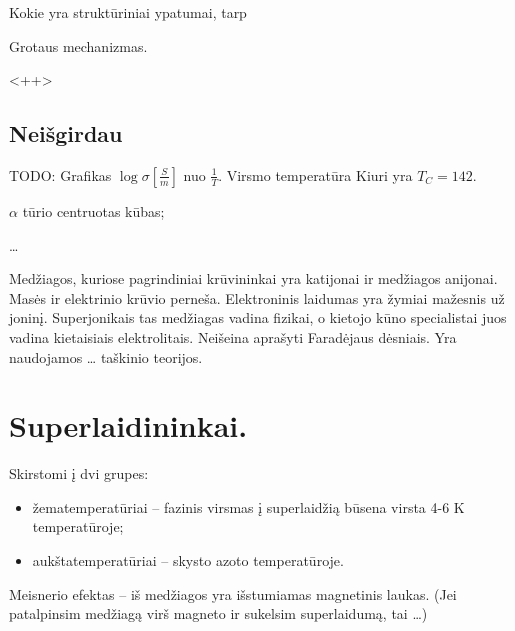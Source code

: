 \begin{remember}
  \item Kokie yra struktūriniai ypatumai, tarp 
  \item Grotaus mechanizmas.

\end{remember}<++>

\subsection{Neišgirdau}

TODO: Grafikas $\log \sigma [\frac{S}{m}]$ nuo $\frac{1}{T}$.
Virsmo temperatūra Kiuri yra $T_{C} = 142$.

\begin{remember}
  \item $\alpha$ tūrio centruotas kūbas;
  \item …
\end{remember}


Medžiagos, kuriose pagrindiniai krūvininkai yra katijonai ir medžiagos
anijonai. Masės ir elektrinio krūvio perneša. Elektroninis laidumas yra
žymiai mažesnis už joninį. Superjonikais tas medžiagas vadina fizikai,
o kietojo kūno specialistai juos vadina kietaisiais elektrolitais.
Neišeina aprašyti Faradėjaus dėsniais. Yra naudojamos … taškinio teorijos.
\section{Superlaidininkai.}
Skirstomi į dvi grupes:
\begin{itemize}
  \item žematemperatūriai – fazinis virsmas į superlaidžią būsena virsta
    4-6 K temperatūroje;
  \item aukštatemperatūriai – skysto azoto temperatūroje.
\end{itemize}
Meisnerio efektas – iš medžiagos yra išstumiamas magnetinis laukas.
(Jei patalpinsim medžiagą virš magneto ir sukelsim superlaidumą,
tai …)

